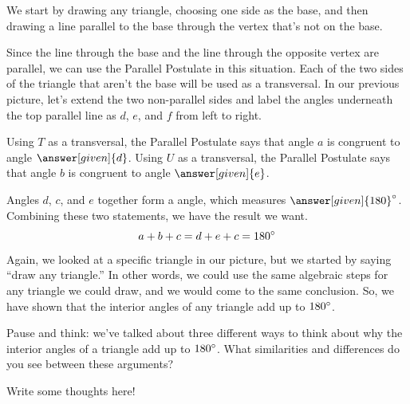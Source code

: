 \documentclass{ximera}
\begin{document}
\begin{explanation}
We start by drawing any triangle, choosing one side as the base, and then drawing a line parallel to the base through the vertex that's not on the base.
\begin{image}
\end{image}
Since the line through the base and the line through the opposite vertex are parallel, we can use the Parallel Postulate in this situation. Each of the two sides of the triangle that aren't the base will be used as a transversal. In our previous picture, let's extend the two non-parallel sides and label the angles underneath the top parallel line as $d$, $e$, and $f$ from left to right.
\begin{image}
\end{image}

Using $T$ as a transversal, the Parallel Postulate says that angle $a$ is congruent to angle $\answer[given]{d}$. Using $U$ as a transversal, the Parallel Postulate says that angle $b$ is congruent to angle $\answer[given]{e}$.

Angles $d$, $c$, and $e$ together form a  angle, which measures $\answer[given]{180}\degree$. Combining these two statements, we have the result we want.
\[
a+b+c = d + e + c = 180\degree
\]
Again, we looked at a specific triangle in our picture, but we started by saying ``draw any triangle.'' In other words, we could use the same algebraic steps for any triangle we could draw, and we would come to the same conclusion. So, we have shown that the interior angles of any triangle add up to $180\degree$.

\end{explanation}

\begin{question}
Pause and think: we've talked about three different ways to think about why the interior angles of a triangle add up to $180\degree$. What similarities and differences do you see between these arguments? 
\begin{freeResponse}
Write some thoughts here!
\end{freeResponse}
\end{question}
\end{document}
